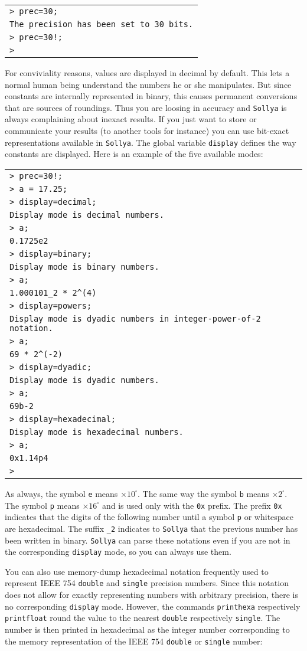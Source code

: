 \documentclass[a4paper]{article}
\newcommand{\com}[1]{\texttt{#1}}
\newcommand{\key}[1]{\texttt{#1}}
\newcommand{\sollya}{\texttt{Sollya}\xspace}
\newcommand{\code}[1]{
\begin{center}
\begin{tabular}{|p{14.8cm}|}
\hline
#1
\hline
\end{tabular}
\end{center}
}
\newcommand{\ligne}[1]{\texttt{#1}\\}
\begin{document}
\code{
\ligne{> prec=30;}
\ligne{The precision has been set to 30 bits.}
\ligne{> prec=30!;}
\ligne{>}
}

For conviviality reasons, values are displayed in decimal by default. This lets a normal human being understand the numbers he or she manipulates. But since constants are internally represented in binary, this causes permanent conversions that are sources of roundings. Thus you are loosing in accuracy and \sollya is always complaining about inexact results. If you just want to store or communicate your results (to another tools for instance) you can use bit-exact representations available in \sollya. The global variable \key{display} defines the way constants are displayed. Here is an example of the five available modes:


\code{
\ligne{> prec=30!;}
\ligne{> a = 17.25;}
\ligne{> display=decimal;}
\ligne{Display mode is decimal numbers.}
\ligne{> a;}
\ligne{0.1725e2}
\ligne{> display=binary;}
\ligne{Display mode is binary numbers.}
\ligne{> a;}
\ligne{1.000101\_2 * 2\^{}(4)}
\ligne{> display=powers;}
\ligne{Display mode is dyadic numbers in integer-power-of-2 notation.}
\ligne{> a;}
\ligne{69 * 2\^{}(-2)}
\ligne{> display=dyadic;}
\ligne{Display mode is dyadic numbers.}
\ligne{> a;}
\ligne{69b-2}
\ligne{> display=hexadecimal;}
\ligne{Display mode is hexadecimal numbers.}
\ligne{> a;}
\ligne{0x1.14p4}
\ligne{> }
}

As always, the symbol \texttt{e} means $\times 10^\square $. The same way the symbol \texttt{b} means  $\times 2^\square $. The symbol \texttt{p} means $\times 16^\square$ and is used only with the \texttt{0x} prefix. The prefix \texttt{0x} indicates that the digits of the following number until 
a symbol \texttt{p} or whitespace are hexadecimal. The suffix \texttt{\_2} indicates to \sollya that the previous number has been written in binary. \sollya can parse these notations even if you are not in the corresponding \key{display} mode, so you can always use them.

You can also use memory-dump hexadecimal notation frequently used to represent IEEE 754 \texttt{double} and \texttt{single} precision numbers. Since this notation does not allow for exactly representing numbers with arbitrary precision, there is no corresponding \key{display} mode. However, the commands \com{printhexa} respectively \com{printfloat} round the value to the nearest \texttt{double} respectively \texttt{single}. The number is then printed in hexadecimal as the integer number corresponding to the memory representation of the IEEE 754 \texttt{double} or \texttt{single} number:
\end{document}
